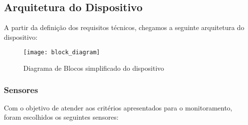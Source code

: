 \documentclass[../monografia.tex]{subfiles}
\begin{document}
\subsection{Arquitetura do Dispositivo} 
A partir da definição dos requisitos técnicos, chegamos a seguinte arquitetura do dispositivo:

\begin{figure}[h]
    \centering
    \texttt{[image: block\_diagram]}
    \caption{Diagrama de Blocos simplificado do dispositivo}
    \label{fig:Diagrama de Blocos}
\end{figure}

\subsubsection{Sensores}
Com o objetivo de atender aos critérios apresentados para o monitoramento, foram escolhidos os seguintes sensores: 
\end{document}
